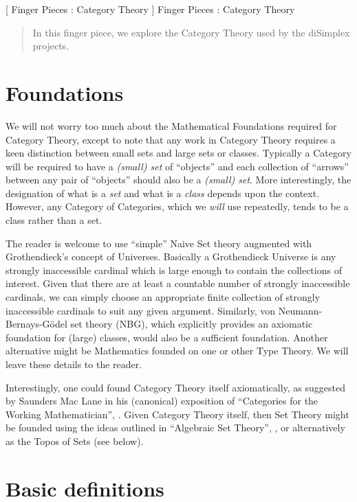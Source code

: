 
[
  Finger Pieces : Category Theory
]{
  Finger Pieces : Category Theory
}
\author{Stephen Gaito}

\maketitle

\begin{abstract}
  In this finger piece, we explore the Category Theory used by the
  diSimplex projects.
\end{abstract}

\section*{Foundations}

We will not worry too much about the Mathematical Foundations required for
Category Theory, except to note that any work in Category Theory requires a keen
distinction between small sets and large sets or classes. Typically a Category
will be required to have a \emph{(small) set} of ``objects'' and each collection
of ``arrows'' between any pair of ``objects'' should also be a \emph{(small)
set}. More interestingly, the designation of what is a \emph{set} and what is a
\emph{class} depends upon the context. However, any Category of Categories,
which we \emph{will} use repeatedly, tends to be a class rather than a set.

The reader is welcome to use ``simple'' Naive Set theory augmented with
Grothendieck's concept of Universes. Basically a Grothendieck Universe is any
strongly inaccessible cardinal which is large enough to contain the collections
of interest. Given that there are at least a countable number of strongly
inaccessible cardinals, we can simply choose an appropriate finite collection of
strongly inaccessible cardinals to suit any given argument. Similarly, von
Neumann-Bernays-Gödel set theory (NBG), which explicitly provides an axiomatic
foundation for (large) classes, would also be a sufficient foundation. Another
alternative might be Mathematics founded on one or other Type Theory. We will
leave these details to the reader.

Interestingly, one could found Category Theory itself axiomatically, as
suggested by Saunders Mac Lane in his (canonical) exposition of ``Categories for
the Working Mathematician'', \cite{macLane1971categoriesWorkingMathematician}.
Given Category Theory itself, then Set Theory might be founded using the ideas
outlined in ``Algebraic Set Theory'', \cite{joyalMoerdijk1995algSetTh}, or
alternatively as the Topos of Sets (see below).

\section*{Basic definitions}